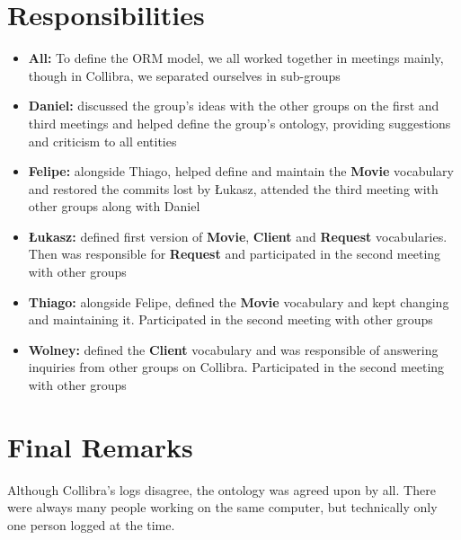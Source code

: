\documentclass[a4paper,10pt]{article}
\begin{document}
\section{Responsibilities}
\begin{itemize}
  \item \textbf{All:} To define the ORM model, we all worked together in meetings mainly, though in Collibra, we separated ourselves in sub-groups
  \item \textbf{Daniel:} discussed the group's ideas with the other groups on the first and third meetings and helped define the group's ontology, providing suggestions and criticism to all entities
  \item \textbf{Felipe:} alongside Thiago, helped define and maintain the \textbf{Movie} vocabulary and restored the commits lost by \L{}ukasz, attended the third meeting with other groups along with Daniel
  \item \textbf{\L{}ukasz:} defined first version of \textbf{Movie}, \textbf{Client} and \textbf{Request} vocabularies. Then was responsible for \textbf{Request} and participated in the second meeting with other groups
  \item \textbf{Thiago:} alongside Felipe, defined the \textbf{Movie} vocabulary and kept changing and maintaining it. Participated in the second meeting with other groups
  \item \textbf{Wolney:} defined the \textbf{Client} vocabulary and was responsible of answering inquiries from other groups on Collibra. Participated in the second meeting with other groups
\end{itemize}

\section{Final Remarks}
Although Collibra's logs disagree, the ontology was agreed upon by all. There were always many people working on the same computer, but technically only one person logged at the time.
\end{document}
